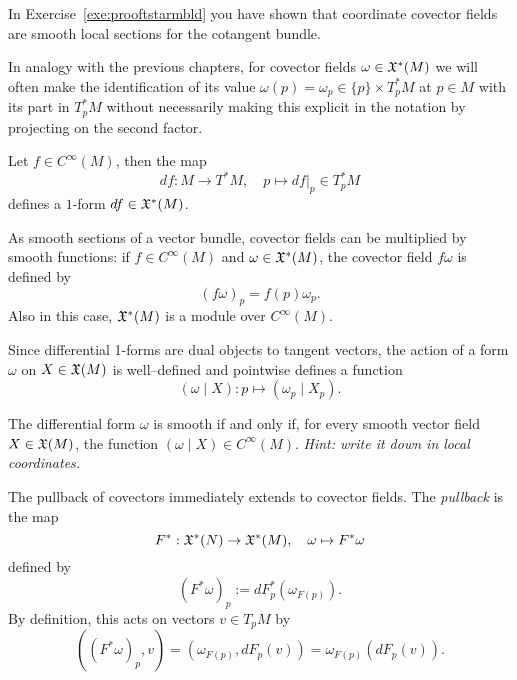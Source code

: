 \begin{remark}
  In Exercise~\ref{exe:prooftstarmbld} you have shown that coordinate covector fields are smooth local sections for the cotangent bundle.
\end{remark}

In analogy with the previous chapters, for covector fields $\omega\in\mathfrak{X}^*(M)$ we will often make the identification of its value $\omega(p) = \omega_p \in \{p\}\times T^*_p M$ at $p\in M$ with its part in $T_p^*M$ without necessarily making this explicit in the notation by projecting on the second factor.

\begin{example}
  Let $f\in C^\infty(M)$, then the map
  \begin{equation}
    df : M \to T^*M, \quad p \mapsto df|_p \in T^*_p M
  \end{equation}
  defines a $1$-form $df\in\mathfrak{X}^*(M)$.
\end{example}

As smooth sections of a vector bundle, covector fields can be multiplied by smooth functions: if $f\in C^\infty(M)$ and $\omega\in\mathfrak{X}^*(M)$, the covector field $f\omega$ is defined by
\begin{equation}
  (f\omega)_p = f(p)\omega_p.
\end{equation}
Also in this case, $\mathfrak{X}^*(M)$ is a module over $C^\infty(M)$.

Since differential 1-forms are dual objects to tangent vectors, the action of a form $\omega$ on $X\in\mathfrak{X}(M)$ is well--defined and pointwise defines a function
\begin{equation}
  (\omega \mid X) : p \mapsto (\omega_p \mid X_p).
\end{equation}

\begin{exercise}
  The differential form $\omega$ is smooth if and only if, for every smooth vector field $X\in\mathfrak{X}(M)$, the function $(\omega \mid X)\in C^\infty(M)$.
  \textit{\small Hint: write it down in local coordinates.}
\end{exercise}

\begin{definition}\label{def:pullback1f}
  The pullback of covectors immediately extends to covector fields.
  The \emph{pullback} is the map
  \begin{equation}
    F^*: \mathfrak{X}^*(N) \to \mathfrak{X}^*(M), \quad \omega \mapsto F^* \omega
  \end{equation}
  defined by
  \begin{equation}
    (F^*\omega)_p := dF_p^*(\omega_{F(p)}).
  \end{equation}
  By definition, this acts on vectors $v\in T_p M$ by
  \begin{equation}
    ((F^*\omega)_p, v) = (\omega_{F(p)}, dF_p(v)) = \omega_{F(p)}(dF_p(v)).
  \end{equation}
\end{definition}

